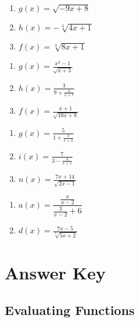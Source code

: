 \begin{multicols}{3}
\begin{enumerate}	\setcounter{enumi}{\value{Review}}
	\item $g(x) = \sqrt{-9x+8}$
	\item $h(x) = -\sqrt[3]{4x+1}$
	\item $f(x) = \sqrt[3]{8x+1}$
\end{enumerate}	\setcounter{Review}{\value{enumi}}
\end{multicols}
\begin{multicols}{3}
\begin{enumerate}	\setcounter{enumi}{\value{Review}}
	\item $g(x) = \frac{x^2-1}{\sqrt{x+3}}$
	\item $h(x) = \frac{3}{9 + \frac{4}{x+7}}$
	\item $f(x) = \frac{x+1}{\sqrt{10x+8}}$
\end{enumerate}	\setcounter{Review}{\value{enumi}}
\end{multicols}
\begin{multicols}{3}
\begin{enumerate}	\setcounter{enumi}{\value{Review}}
	\item $g(x) = \frac{5}{1+\frac{3}{x+2}}$
	\item $i(x) = \frac{7}{3-\frac{4}{x+1}}$
	\item $n(x) = \frac{7x+14}{\sqrt{2x-1}}$
\end{enumerate}	\setcounter{Review}{\value{enumi}}
\end{multicols}
\begin{multicols}{3}
\begin{enumerate}	\setcounter{enumi}{\value{Review}}
	\item $a(x) = \dfrac{\frac{x}{x-2}}{{\frac{3}{x-2}+6}}$
	\item $d(x) = \frac{7x-5}{\sqrt[3]{5x+2}}$
\end{enumerate}
\end{multicols}



\newpage

\section{Answer Key}

\subsection*{Evaluating Functions}

